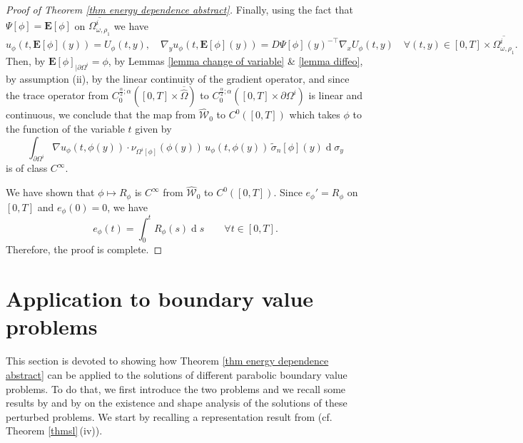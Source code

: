 \documentclass[11pt,reqno,a4paper]{amsart}
\theoremstyle{plain}
\theoremstyle{definition}
\renewcommand{\d}[1]{\ensuremath{\operatorname{d}\!{#1}}}
\begin{document}
\begin{proof}[Proof of Theorem \ref{thm energy dependence abstract}]
    Finally, using the fact that $\Psi[\phi]=\mathbf{E}[\phi]$ on $\overline{\Omega^i_{\omega,\rho_1}}$ we have 
    \[
        u_{\phi}(t,\mathbf{E}[\phi](y)) = U_{\phi}(t,y),\quad \nabla_y u_\phi(t,\mathbf{E}[\phi](y))
        =D\Psi[\phi](y)^{-\top}\nabla_x U_\phi(t,y)
        \quad \forall (t,y) \in [0,T] \times \overline{\Omega^i_{\omega,\rho_1}}.
    \]
    Then, by $\mathbf{E}[\phi]_{|\partial\Omega^i}=\phi$, by Lemmas \ref{lemma change of variable} \& \ref{lemma diffeo}, by assumption (ii), by the linear continuity of the gradient operator, and since the trace operator from $C_0^{\frac\alpha2;\alpha}([0,T]\times\overline{\widehat\Omega})$ to $C_0^{\frac\alpha2;\alpha}([0,T]\times\partial\Omega^i)$ is linear and continuous, we conclude that the map from $\widehat{\mathcal{W}}_0$ to $C^0([0,T])$ which takes $\phi$ to the function of the variable $t$ given by
    \[
    \int_{\partial\Omega^i}\nabla u_\phi(t,\phi(y))\cdot\nu_{\Omega^i[\phi]}(\phi(y)) \, u_\phi(t,\phi(y)) \, \tilde\sigma_n[\phi](y) \d\sigma_y
    \]
    is of class $C^\infty$.

    We have shown that $\phi\mapsto R_\phi$ is $C^\infty$ from $\widehat{\mathcal{W}}_0$ to $C^0([0,T])$. Since $e_\phi'=R_\phi$ on $[0,T]$ and $e_\phi(0)=0$, we have
    \[
        e_\phi(t)=\int_0^t R_\phi(s) \d s \qquad \forall t\in[0,T].
    \]
    Therefore, the proof is complete.
\end{proof}

\section{Application to boundary value problems}\label{sec: application}
This section is devoted to showing how Theorem \ref{thm energy dependence abstract} can be applied to the solutions of different parabolic boundary value problems. To do that, we first introduce the two problems and we recall some results by \cite{DaLuMoMu24.2} and by \cite{DaLuMu25} on the existence and shape analysis of the solutions of these perturbed problems. We start by recalling a representation result from \cite[Lem.\,1]{DaLuMoMu24.2} (cf. Theorem \ref{thmsl}\,(iv)).
\end{document}
